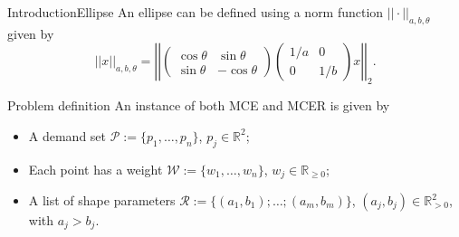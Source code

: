 \documentclass{beamer}
\newcommand{\R}{\mathbb{R}}
\newcommand{\Pp}{\mathscr{P}}
\newcommand{\Ww}{\mathscr{W}}
\newcommand{\Rr}{\mathscr{R}}
\theoremstyle{definition}
\begin{document}
\begin{frame}{Introduction}{Ellipse}
	An ellipse can be defined using a norm function $||\cdot||_{a,b,\theta}$ given by
	\begin{equation*}
		||x||_{a,b, \theta}=\left|\left|
		\left(\begin{array}{rr}
		\cos{\theta} & \sin{\theta}\\
		\sin{\theta} & -\cos{\theta}
		\end{array}
		\right)
		\left(\begin{array}{cc}
		1/a & 0\\
		0 & 1/b
		\end{array}\right) x \right|\right|_2.
	\end{equation*}
\end{frame}

\begin{frame}{Problem definition}
	An instance of both MCE and MCER is given by
	\begin{itemize}
		\item A demand set $\Pp:=\{p_1, \dots, p_n\}$, $p_j \in \R^2$;
		\item Each point has a weight $\Ww := \{w_1, \dots, w_n\}$, $w_j \in \R_{\ge0}$;
		\item A list of shape parameters $\Rr := \{(a_1, b_1); \dots; (a_m, b_m)\}$, $(a_j, b_j) \in \R^2_{>0}$, with $a_j > b_j$.
	\end{itemize}
\end{frame}
\end{document}
